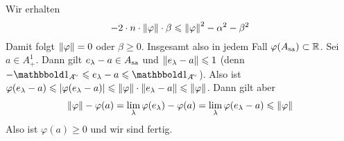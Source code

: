 \begin{beweis}
	Wir erhalten 
	\[
		- 2 \cdot n \cdot \norm*{\varphi} \cdot \beta \le \norm*{\varphi}^2 - \alpha^2 -\beta^2
	\]
	Damit folgt $\norm*{\varphi}= 0$ oder $\beta\ge 0$. Insgesamt also in jedem Fall $\varphi(A_\sa) \subset \mathbb{R}$.
	Sei $a \in A_+^1$. Dann gilt $e_\lambda-a \in A_\sa$ und $\norm*{e_\lambda-a} \le 1$ (denn $- \ind_{A^\simm}\le e_\lambda-a \le \ind_{A^\simm}$).
	Also ist $\varphi(e_\lambda-a) \le \abs*{\varphi(e_\lambda-a)} \le \norm*{\varphi} \cdot \norm*{e_\lambda-a} \le \norm*{\varphi}$.
	Dann gilt aber
	\begin{align}
		\norm*{\varphi}- \varphi(a) = \lim_{\lambda} \varphi(e_\lambda) - \varphi(a) = \lim_\lambda \varphi \enbrace*{e_\lambda-a} \le \norm*{\varphi}
	\end{align}
	Also ist $\varphi(a) \ge 0$ und wir sind fertig.
\end{beweis}

